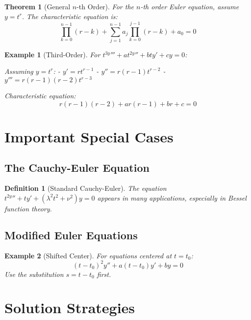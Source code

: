 \documentclass[12pt]{article}
\newtheorem{definition}{Definition}
\newtheorem{theorem}{Theorem}
\newtheorem{example}{Example}
\begin{document}
\begin{theorem}[General $n$-th Order]
For the $n$-th order Euler equation, assume $y = t^{r}$. The characteristic equation is:
$$\prod_{k=0}^{n-1}(r-k) + \sum_{j=1}^{n-1} a_{j} \prod_{k=0}^{j-1}(r-k) + a_{0} = 0$$
\end{theorem}

\begin{example}[Third-Order]
For $t^{3y}''' + at^{2y}'' + bty' + cy = 0$:

Assuming $y = t^{r}$:
- $y' = rt^{r-1}$
- $y'' = r(r-1)t^{r-2}$
- $y''' = r(r-1)(r-2)t^{r-3}$

Characteristic equation:
$$r(r-1)(r-2) + ar(r-1) + br + c = 0$$
\end{example}

\section{Important Special Cases}

\subsection{The Cauchy-Euler Equation}

\begin{definition}[Standard Cauchy-Euler]
The equation $t^{2y}'' + ty' + (\lambda^{2} t^{2} + \nu^{2})y = 0$ appears in many applications, especially in Bessel function theory.
\end{definition}

\subsection{Modified Euler Equations}

\begin{example}[Shifted Center]
For equations centered at $t = t_{0}$:
$$(t-t_{0})^{2} y'' + a(t-t_{0})y' + by = 0$$
Use the substitution $s = t - t_{0}$ first.
\end{example}

\section{Solution Strategies}
\end{document}
